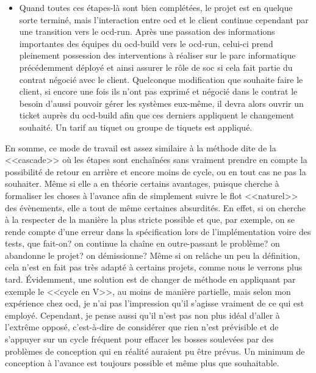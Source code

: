 \documentclass[12pt, oneside, a4paper, titlepage]{report}
\begin{document}
\begin{itemize}
    \item Quand toutes ces étapes-là sont bien complétées, le projet est en
        quelque sorte terminé, mais l'interaction entre \gls{ocd} et le client
        continue cependant par une transition vers le \gls{ocd-run}. Après une
        passation des informations importantes des équipes du \gls{ocd-build}
        vers le \gls{ocd-run}, celui-ci prend pleinement possession des
        interventions à réaliser sur le parc informatique précédemment déployé
        et ainsi assurer le rôle de \gls{soc} si cela fait partie du contrat
        négocié avec le client. Quelconque modification que souhaite faire le
        client, si encore une fois ils n'ont pas exprimé et négocié dans le
        contrat le besoin d'aussi pouvoir gérer les systèmes eux-même, il devra
        alors ouvrir un ticket auprès du \gls{ocd-build} afin que ces derniers
        appliquent le changement souhaité. Un tarif au tiquet ou groupe de
        tiquets est appliqué.

\end{itemize}

En somme, ce mode de travail est assez similaire à la méthode dite de la
<<cascade>> où les étapes sont enchaînées sans vraiment prendre en compte la
possibilité de retour en arrière et encore moins de cycle, ou en tout cas ne pas
la souhaiter. Même si elle a en théorie certains avantages, puisque cherche à
formaliser les choses à l'avance afin de simplement suivre le flot <<naturel>>
des évènements, elle a tout de même certaines absurdités. En effet, si on
cherche à la respecter de la manière la plus stricte possible et que, par
exemple, on se rende compte d'une erreur dans la spécification lors de
l'implémentation voire des tests, que fait-on? on continue la chaîne en
outre-passant le problème? on abandonne le projet? on démissionne? Même si on
relâche un peu la définition, cela n'est en fait pas très adapté à certains
projets, comme nous le verrons plus tard. Évidemment, une solution est de
changer de méthode en appliquant par exemple le <<cycle en V>>, au moins de
manière partielle, mais selon mon expérience chez \gls{ocd}, je n'ai pas
l'impression qu'il s'agisse vraiment de ce qui est employé. Cependant, je pense
aussi qu'il n'est pas non plus idéal d'aller à l'extrême opposé, c'est-à-dire de
considérer que rien n'est prévisible et de s'appuyer sur un cycle fréquent pour
effacer les bosses soulevées par des problèmes de conception qui en réalité
auraient pu être prévus. Un minimum de conception à l'avance est toujours
possible et même plus que souhaitable.
\end{document}
